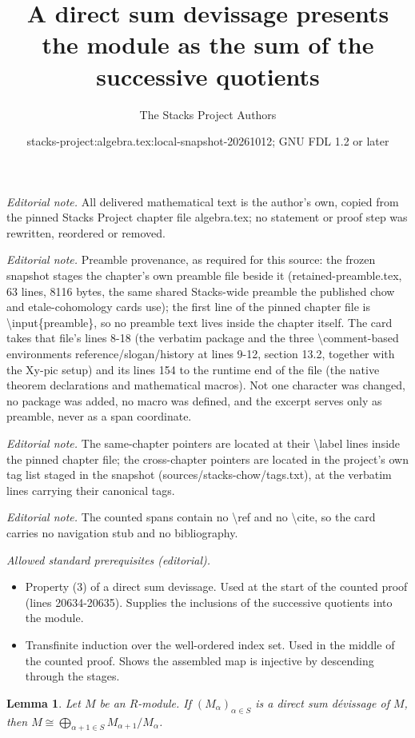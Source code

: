 \documentclass[10pt,a4paper]{amsart}
\title{A direct sum devissage presents the module as the sum of the successive quotients}
\author{The Stacks Project Authors}
\date{stacks-project:algebra.tex:local-snapshot-20261012; GNU FDL 1.2 or later}
\theoremstyle{plain}
\newtheorem{lemma}[subsection]{Lemma}
\theoremstyle{definition}
\theoremstyle{remark}
\numberwithin{equation}{subsection}
\begin{document}
\maketitle
\noindent\textit{Editorial note.} All delivered mathematical text is the author's own, copied from the pinned Stacks Project chapter file algebra.tex; no statement or proof step was rewritten, reordered or removed.\par\medskip
\noindent\textit{Editorial note.} Preamble provenance, as required for this source: the frozen snapshot stages the chapter's own preamble file beside it (retained-preamble.tex, 63 lines, 8116 bytes, the same shared Stacks-wide preamble the published chow and etale-cohomology cards use); the first line of the pinned chapter file is \textbackslash{}input\{preamble\}, so no preamble text lives inside the chapter itself. The card takes that file's lines 8-18 (the verbatim package and the three \textbackslash{}comment-based environments reference/slogan/history at lines 9-12, section 13.2, together with the Xy-pic setup) and its lines 154 to the runtime end of the file (the native theorem declarations and mathematical macros). Not one character was changed, no package was added, no macro was defined, and the excerpt serves only as preamble, never as a span coordinate.\par\medskip
\noindent\textit{Editorial note.} The same-chapter pointers are located at their \textbackslash{}label lines inside the pinned chapter file; the cross-chapter pointers are located in the project's own tag list staged in the snapshot (sources/stacks-chow/tags.txt), at the verbatim lines carrying their canonical tags.\par\medskip
\noindent\textit{Editorial note.} The counted spans contain no \textbackslash{}ref and no \textbackslash{}cite, so the card carries no navigation stub and no bibliography.\par\medskip
\noindent\textit{Allowed standard prerequisites (editorial).}\begin{itemize}
\item Property (3) of a direct sum devissage. Used at the start of the counted proof (lines 20634-20635). Supplies the inclusions of the successive quotients into the module.
\item Transfinite induction over the well-ordered index set. Used in the middle of the counted proof. Shows the assembled map is injective by descending through the stages.
\end{itemize}\medskip
\begin{lemma}
\label{lemma-direct-sum-devissage}
Let $M$ be an $R$-module.  If $(M_{\alpha})_{\alpha \in S}$ is a direct sum
d\'evissage of $M$, then
$M \cong \bigoplus_{\alpha + 1 \in S} M_{\alpha + 1}/M_{\alpha}$.
\end{lemma}
\end{document}
